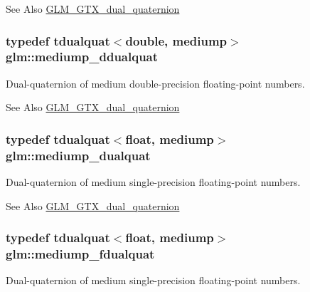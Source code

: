\begin{DoxySeeAlso}{See Also}
\hyperlink{group__gtx__dual__quaternion}{G\-L\-M\-\_\-\-G\-T\-X\-\_\-dual\-\_\-quaternion} 
\end{DoxySeeAlso}
\hypertarget{group__gtx__dual__quaternion_ga5727116ab20b2a1d40387766d723dd6c}{
\subsubsection[{mediump\-\_\-ddualquat}]{\setlength{\rightskip}{0pt plus 5cm}typedef tdualquat$<$double, mediump$>$ {\bf glm\-::mediump\-\_\-ddualquat}}}\label{group__gtx__dual__quaternion_ga5727116ab20b2a1d40387766d723dd6c}
Dual-\/quaternion of medium double-\/precision floating-\/point numbers.

\begin{DoxySeeAlso}{See Also}
\hyperlink{group__gtx__dual__quaternion}{G\-L\-M\-\_\-\-G\-T\-X\-\_\-dual\-\_\-quaternion} 
\end{DoxySeeAlso}
\hypertarget{group__gtx__dual__quaternion_gaa88fe93eb823d1aba8d6df8028572cb5}{
\subsubsection[{mediump\-\_\-dualquat}]{\setlength{\rightskip}{0pt plus 5cm}typedef tdualquat$<$float, mediump$>$ {\bf glm\-::mediump\-\_\-dualquat}}}\label{group__gtx__dual__quaternion_gaa88fe93eb823d1aba8d6df8028572cb5}
Dual-\/quaternion of medium single-\/precision floating-\/point numbers.

\begin{DoxySeeAlso}{See Also}
\hyperlink{group__gtx__dual__quaternion}{G\-L\-M\-\_\-\-G\-T\-X\-\_\-dual\-\_\-quaternion} 
\end{DoxySeeAlso}
\hypertarget{group__gtx__dual__quaternion_ga93e9def86ffeedd48d9c79a6afacfa6c}{
\subsubsection[{mediump\-\_\-fdualquat}]{\setlength{\rightskip}{0pt plus 5cm}typedef tdualquat$<$float, mediump$>$ {\bf glm\-::mediump\-\_\-fdualquat}}}\label{group__gtx__dual__quaternion_ga93e9def86ffeedd48d9c79a6afacfa6c}
Dual-\/quaternion of medium single-\/precision floating-\/point numbers.

